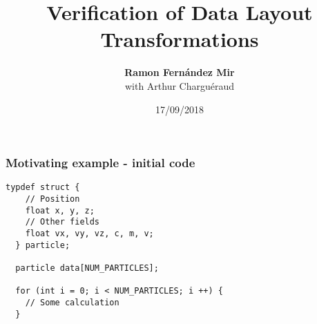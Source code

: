 \def\macrosUseBeamer{}




\usepackage{multicol}

\newcommand\tab{$\hphantom{--}$}





\title{Verification of Data Layout Transformations}
\author[Ramon Fern\'{a}ndez Mir]{{\bf Ramon Fern\'{a}ndez Mir}\\ \vspace{1em} with Arthur Charguéraud }
\date{17/09/2018}

\frame{\titlepage}




\begin{frame}[fragile]
\frametitle{Motivating example - initial code}

\begin{lstlisting}[style=Cstyle]
  typdef struct {
    // Position
    float x, y, z;
    // Other fields
    float vx, vy, vz, c, m, v;
  } particle;
  
  particle data[NUM_PARTICLES];
  
  for (int i = 0; i < NUM_PARTICLES; i ++) {
    // Some calculation
  }
\end{lstlisting}


\end{frame}

